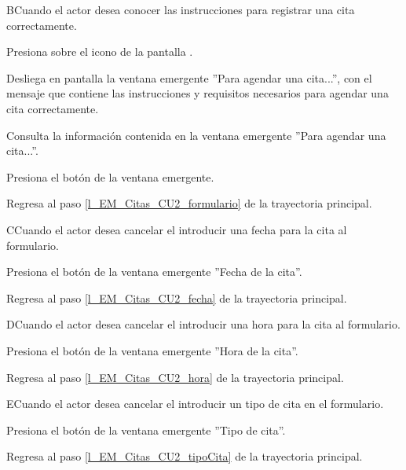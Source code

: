 \begin{UCtrayectoriaA}{B}{Cuando el actor desea conocer las instrucciones para registrar una cita correctamente.}

	\UCpaso Presiona sobre el icono  de la pantalla .

	\UCpaso Desliega en pantalla la ventana emergente ''Para agendar una cita...'', con el mensaje  que contiene las instrucciones y requisitos necesarios para agendar una cita correctamente.

	\UCpaso [\UCactor] Consulta la información contenida en la ventana emergente ''Para agendar una cita...''.

	\UCpaso [\UCactor] Presiona el botón  de la ventana emergente.

	\UCpaso Regresa al paso \ref{l_EM_Citas_CU2_formulario} de la trayectoria principal. 

\end{UCtrayectoriaA}

\begin{UCtrayectoriaA}{C}{Cuando el actor desea cancelar el introducir una fecha para la cita al formulario.}

	\UCpaso [\UCactor] Presiona el botón  de la ventana emergente ''Fecha de la cita''.

	\UCpaso Regresa al paso \ref{l_EM_Citas_CU2_fecha} de la trayectoria principal.
	
\end{UCtrayectoriaA}

\begin{UCtrayectoriaA}{D}{Cuando el actor desea cancelar el introducir una hora para la cita al formulario.}

	\UCpaso [\UCactor] Presiona el botón  de la ventana emergente ''Hora de la cita''. 

	\UCpaso Regresa al paso \ref{l_EM_Citas_CU2_hora} de la trayectoria principal.
	
\end{UCtrayectoriaA}

\begin{UCtrayectoriaA}{E}{Cuando el actor desea cancelar el introducir un tipo de cita en el formulario.}

	\UCpaso [\UCactor] Presiona el botón  de la ventana emergente ''Tipo de cita''. 

	\UCpaso Regresa al paso \ref{l_EM_Citas_CU2_tipoCita} de la trayectoria principal.
	
\end{UCtrayectoriaA}